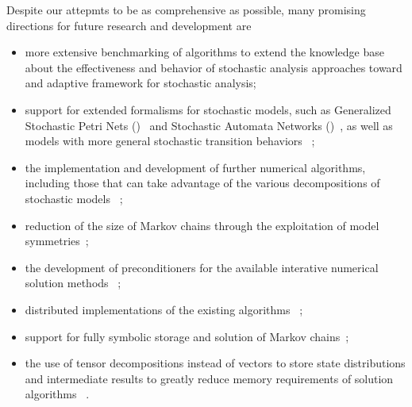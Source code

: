 Despite our attepmts to be as comprehensive as possible, many
promising directions for future research and development are
\begin{itemize}
\item more extensive benchmarking of algorithms to extend the
  knowledge base about the effectiveness and behavior of stochastic
  analysis approaches toward and adaptive framework for stochastic
  analysis;
\item support for extended formalisms for stochastic models, such as
  Generalized Stochastic Petri Nets ()~%
  \citep{DBLP:journals/tse/TeruelFP03} and Stochastic Automata Networks
  ()~\citep{DBLP:conf/pnpm/1985}, as well as models with
  more general stochastic transition behaviors~%
  \citep{Longo:2015:TSR:2767455.2767457};
\item the implementation and development of further numerical
  algorithms, including those that can take advantage of the various
  decompositions of stochastic models~%
  \citep{buchholz1999structured,buchholz2000multilevel,%
    dayar2012analyzing};
\item reduction of the size of Markov chains through the exploitation
  of model symmetries~\citep{buchholz1994exact,haddad1995evaluation};
\item the development of preconditioners for the available interative
  numerical solution methods~%
  \citep{DBLP:journals/informs/LangvilleS04};
\item distributed implementations of the existing algorithms~%
  \citep{DBLP:conf/imcsit/BylinaB08};
\item support for fully symbolic storage and solution of Markov
  chains~\citep{DBLP:journals/sigmetrics/CiardoM05,%
  DBLP:conf/qest/ZhaoC12,DBLP:conf/qest/2012};
\item the use of tensor decompositions instead of vectors to store
  state distributions and intermediate results to greatly reduce
  memory requirements of solution algorithms~%
  \citep{grasedyck2013literature,ballani2013projection,%
  dolgov2013tt}.
\end{itemize}
